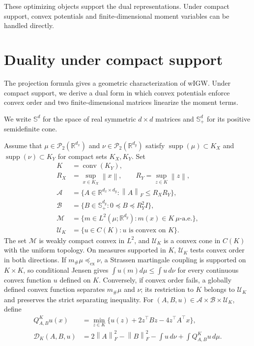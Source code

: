 \documentclass[11pt]{article}
\newcommand{\R}{\mathbb R}
\newcommand{\cP}{\mathcal P}
\newcommand{\cU}{\mathcal U}
\newcommand{\cM}{\mathcal M}
\newcommand{\norm}[1]{\left\lVert #1\right\rVert}
\newcommand{\cx}{\preceq_{\mathrm{cx}}}
\theoremstyle{plain}
\theoremstyle{definition}
\theoremstyle{remark}
\begin{document}
These optimizing objects support the dual representations. Under compact support,
convex potentials and finite-dimensional moment variables can be handled directly.

\section{Duality under compact support}\label{sec:compact-duality}

The projection formula gives a geometric characterization of wIGW. Under compact
support, we derive a dual form in which convex potentials enforce convex
order and two finite-dimensional matrices linearize the moment terms.

We write \(\mathbb S^d\) for the space of real symmetric \(d\times d\)
matrices and \(\mathbb S_+^d\) for its positive semidefinite cone.

Assume that \(\mu\in\cP_2(\R^{d_x})\) and \(\nu\in\cP_2(\R^{d_y})\) satisfy
\(\operatorname{supp}(\mu)\subset K_X\) and
\(\operatorname{supp}(\nu)\subset K_Y\) for compact sets \(K_X,K_Y\). Set
\begin{equation}\label{eq:compact-dual-domains}
\begin{aligned}
  K&=\operatorname{conv}(K_Y),\\
  R_X&=\sup_{x\in K_X}\norm{x},\qquad
  R_Y=\sup_{z\in K}\norm{z},\\
  \mathcal A&=\{A\in\R^{d_x\times d_y}:\norm{A}_F\le R_X R_Y\},\\
  \mathcal B&=\{B\in\mathbb S_+^{d_y}:0\preceq B\preceq R_Y^2I\},\\
  \cM&=\{m\in L^2(\mu;\R^{d_y}):m(x)\in K\ \mu\text{-a.e.}\},\\
  \cU_K&=\{u\in C(K):u\text{ is convex on }K\}.
\end{aligned}
\end{equation}
The set \(\cM\) is weakly compact convex in \(L^2\), and \(\cU_K\) is a convex
cone in \(C(K)\) with the uniform topology. On measures supported in \(K\),
\(\cU_K\) tests convex order in both directions. If \(m_\#\mu\cx\nu\), a
Strassen martingale coupling is supported on \(K\times K\), so conditional Jensen
gives \(\int u(m)d\mu\le\int u\,d\nu\) for every continuous convex function
\(u\) defined on \(K\). Conversely, if convex order fails, a globally defined
convex function separates \(m_\#\mu\) and \(\nu\); its restriction to \(K\)
belongs to \(\cU_K\) and preserves the strict separating inequality.
For
\((A,B,u)\in\mathcal A\times\mathcal B\times\cU_K\), define
\begin{equation}\label{eq:compact-transform-functional}
\begin{aligned}
  Q_{A,B}^{K}u(x)
  &=\min_{z\in K}\{u(z)+2z^\top Bz-4z^\top A^\top x\},\\
  \mathcal D_K(A,B,u)&=2\norm{A}_F^2-\norm{B}_F^2
  -\int u\,d\nu+\int Q_{A,B}^{K}u\,d\mu.
\end{aligned}
\end{equation}
\end{document}
